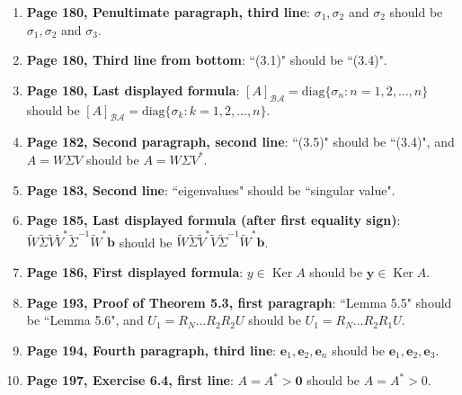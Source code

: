 \documentclass{article}
\begin{document}
\begin{enumerate}[leftmargin=*]
    \item \textbf{Page 180, Penultimate paragraph, third line}: 
          $\sigma_1,\sigma_2$ and $\sigma_2$ should be 
          $\sigma_1,\sigma_2$ and $\sigma_3$.
    
    \item \textbf{Page 180, Third line from bottom}: 
          ``(3.1)" should be ``(3.4)".
    
    \item \textbf{Page 180, Last displayed formula}: 
          $[A]_{\mathcal{B}\mathcal{A}} = \mathrm{diag}\{\sigma_n : n=1,2,\ldots,n\}$ should be 
          $[A]_{\mathcal{B}\mathcal{A}} = \mathrm{diag}\{\sigma_k : k=1,2,\ldots,n\}$.
    
    \item \textbf{Page 182, Second paragraph, second line}: 
          ``(3.5)" should be ``(3.4)", and 
          $A = W\Sigma V$ should be $A = W\Sigma V^*$.
    
    \item \textbf{Page 183, Second line}: 
          ``eigenvalues" should be ``singular value".
    
    \item \textbf{Page 185, Last displayed formula (after first equality sign)}: 
          $\widetilde{W}\widetilde{\Sigma}\widetilde{V}\widetilde{V}^{*}\widetilde{\Sigma}^{-1}\widetilde{W}^{*}\mathbf{b}$ should be 
          $\widetilde{W}\widetilde{\Sigma}\widetilde{V}^{*}\widetilde{V}\widetilde{\Sigma}^{-1}\widetilde{W}^{*}\mathbf{b}$.
    
    \item \textbf{Page 186, First displayed formula}: 
          $y \in \operatorname{Ker} A$ should be $\mathbf{y} \in \operatorname{Ker} A$.
    
    \item \textbf{Page 193, Proof of Theorem 5.3, first paragraph}: 
          ``Lemma 5.5" should be ``Lemma 5.6", and 
          $U_1 = R_N \dots R_2 R_2 U$ should be $U_1 = R_N \dots R_2 R_1 U$.
    
    \item \textbf{Page 194, Fourth paragraph, third line}: 
          $\mathbf{e}_1, \mathbf{e}_2, \mathbf{e}_n$ should be 
          $\mathbf{e}_1, \mathbf{e}_2, \mathbf{e}_3$.
    
    \item \textbf{Page 197, Exercise 6.4, first line}: 
          $A = A^* > \mathbf{0}$ should be $A = A^* > 0$.
\end{enumerate}
\end{document}
